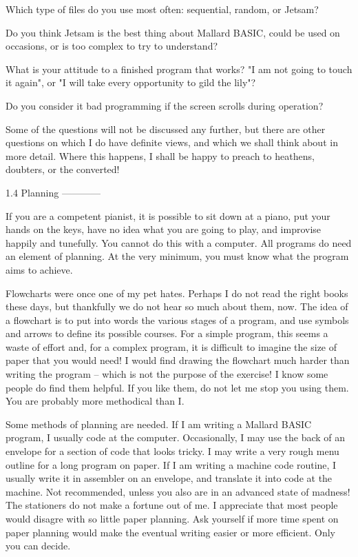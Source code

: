 Which type of files do you use most often: sequential, random, or Jetsam?

Do  you think Jetsam is the best thing about Mallard BASIC, could be  used  on 
occasions, or is too complex to try to understand?

What  is  your attitude to a finished program that works? "I am not  going  to 
touch it again", or "I will take every opportunity to gild the lily"?

Do you consider it bad programming if the screen scrolls during operation?

Some  of the questions will not be discussed any further, but there are  other 
questions on which I do have definite views, and which we shall think about in 
more  detail.  Where  this happens, I shall be happy to  preach  to  heathens, 
doubters, or the converted!


1.4 Planning
------------

If  you  are a competent pianist, it is possible to sit down at a  piano,  put 
your hands on the keys, have no idea what you are going to play, and improvise 
happily  and  tunefully. You cannot do this with a computer. All  programs  do 
need  an  element  of planning. At the very minimum, you must  know  what  the 
program aims to achieve.

Flowcharts  were  once one of my pet hates. Perhaps I do not  read  the  right 
books  these days, but thankfully we do not hear so much about them, now.  The 
idea of a flowchart is to put into words the various stages of a program,  and 
use  symbols and arrows to define its possible courses. For a simple  program, 
this  seems a waste of effort and, for a complex program, it is  difficult  to 
imagine  the  size  of paper that you would need! I  would  find  drawing  the 
flowchart much harder than writing the program -- which is not the purpose  of 
the  exercise! I know some people do find them helpful. If you like  them,  do 
not let me stop you using them. You are probably more methodical than I.

Some methods of planning are needed. If I am writing a Mallard BASIC  program, 
I  usually  code  at  the computer. Occasionally, I may use  the  back  of  an 
envelope  for  a section of code that looks tricky. I may write a  very  rough 
menu  outline  for  a long program on paper. If I am writing  a  machine  code 
routine, I usually write it in assembler on an envelope, and translate it into 
code at the machine. Not recommended, unless you also are in an advanced state 
of madness! The stationers do not make a fortune out of me. I appreciate  that 
most people would disagre with so little paper planning. Ask yourself if  more 
time  spent on paper planning would make the eventual writing easier  or  more 
efficient. Only you can decide.

